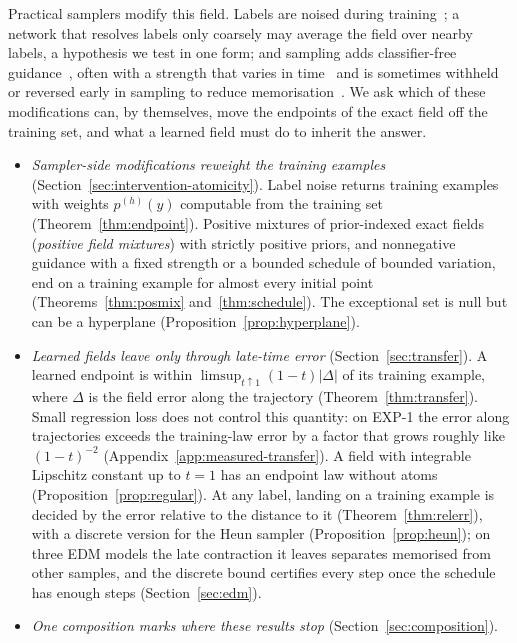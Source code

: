 \documentclass{article} %
\theoremstyle{plain}
\theoremstyle{definition}
\theoremstyle{remark}
\begin{document}
Practical samplers modify this field. Labels are noised during training~\citep{ho2022cascaded};
a network that resolves labels only coarsely may average the field over nearby labels, a
hypothesis we test in one form; and
sampling adds classifier-free guidance~\citep{ho2022classifier}, often with a strength that
varies in time~\citep{kynkaanniemi2024interval} and is sometimes withheld or reversed early in
sampling to reduce memorisation~\citep{jain2025attraction}. We ask which of these
modifications can, by themselves, move the endpoints of the exact field off the training set,
and what a learned field must do to inherit the answer.
\begin{itemize}\itemsep1pt
\item \emph{Sampler-side modifications reweight the training examples}
  (Section~\ref{sec:intervention-atomicity}). Label noise returns training examples with weights
  $p^{(h)}(y)$ computable from the training set (Theorem~\ref{thm:endpoint}). Positive mixtures of
  prior-indexed exact fields (\emph{positive field mixtures}) with strictly positive priors, and
  nonnegative guidance with a fixed strength or a bounded schedule of bounded variation, end on a
  training example for almost every initial point (Theorems~\ref{thm:posmix}
  and~\ref{thm:schedule}). The exceptional set is null but can be a hyperplane
  (Proposition~\ref{prop:hyperplane}).
\item \emph{Learned fields leave only through late-time error} (Section~\ref{sec:transfer}). A
  learned endpoint is within $\limsup_{t\uparrow1}(1-t)|\Delta|$ of its training example, where
  $\Delta$ is the field error along the trajectory (Theorem~\ref{thm:transfer}). Small regression
  loss does not control this quantity: on EXP-1 the error along trajectories
  exceeds the training-law error by a factor that grows roughly like $(1-t)^{-2}$
  (Appendix~\ref{app:measured-transfer}). A field with integrable Lipschitz constant up to $t=1$
  has an endpoint law without atoms (Proposition~\ref{prop:regular}). At any label, landing on a
  training example is decided by the error relative to the distance to it
  (Theorem~\ref{thm:relerr}), with a discrete version for the Heun sampler
  (Proposition~\ref{prop:heun}); on three EDM models the late contraction it leaves separates
  memorised from other samples, and the discrete bound certifies every step once the schedule
  has enough steps (Section~\ref{sec:edm}).
\item \emph{One composition marks where these results stop} (Section~\ref{sec:composition}).

\end{itemize}
\end{document}
